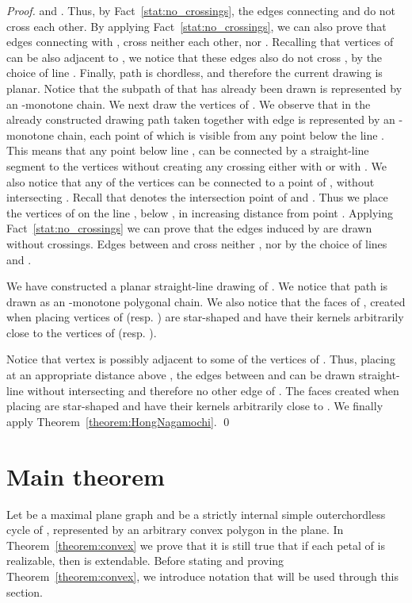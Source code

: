\documentclass{llncs}
\begin{document}
\begin{proof}
and . Thus, by Fact~\ref{stat:no_crossings}, the edges connecting  and   do not cross each other. By applying Fact~\ref{stat:no_crossings}, we can also prove that edges connecting  with , cross neither each other, nor . Recalling that vertices of  can be also adjacent to , we notice that these edges also do not cross , by the choice of line . Finally, path  is chordless, and therefore the current drawing is planar. Notice that the subpath of  that has already been drawn is represented by an -monotone chain.
We next draw the vertices of . We observe that in the already constructed drawing path  taken together with edge  is represented by an -monotone chain, each point of which is visible from any point below the line . This means that any point below line , can be connected by a straight-line segment to the vertices  without creating any crossing either with  or with .  
We also notice that any of the vertices  can be connected to a point of , without intersecting .
Recall that  denotes the intersection point of  and . Thus we place the vertices of  on the line , below , in  increasing distance from point . Applying Fact~\ref{stat:no_crossings} we can prove that the edges induced by  are drawn without crossings. Edges between  and  cross neither , nor  by the choice of lines  and . 

We have constructed a planar straight-line drawing of . We notice that path  is drawn as an -monotone polygonal chain. We also notice that the faces of , created when placing vertices of  (resp. ) are star-shaped and have their kernels arbitrarily close to the vertices of   (resp. ). 


Notice that vertex  is possibly adjacent to some of the vertices of . Thus, placing  at an appropriate distance above , the edges between  and  can be drawn straight-line without intersecting     and therefore no other edge of . The faces created when placing  are star-shaped and have their kernels arbitrarily close to . We finally apply Theorem~\ref{theorem:HongNagamochi}. \qed 
\end{proof}


\section{Main theorem}
\label{sec:main-theorem}

Let  be a maximal plane graph and  be a strictly internal simple outerchordless cycle of , represented by an arbitrary convex polygon  in the plane.
In Theorem~\ref{theorem:convex} we prove that it is still true that if each petal of  is realizable, then  is extendable.
Before stating and proving Theorem~\ref{theorem:convex}, we introduce notation that will be used through this section. 
\end{document}
